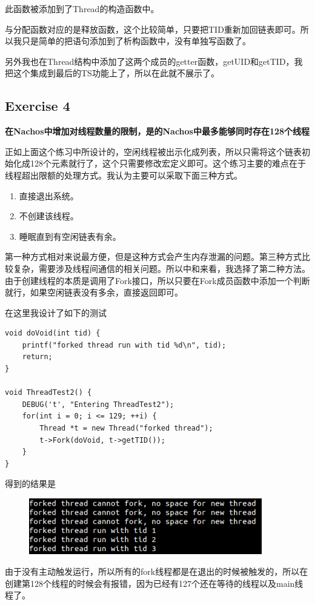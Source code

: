 \documentclass{ctexart}
\begin{document}
此函数被添加到了Thread的构造函数中。

与分配函数对应的是释放函数，这个比较简单，只要把TID重新加回链表即可。所以我只是简单的把语句添加到了析构函数中，没有单独写函数了。

另外我也在Thread结构中添加了这两个成员的getter函数，getUID和getTID，我把这个集成到最后的TS功能上了，所以在此就不展示了。

\subsection*{Exercise 4}
\textbf{在Nachos中增加对线程数量的限制，是的Nachos中最多能够同时存在128个线程}

正如上面这个练习中所设计的，空闲线程被出示化成列表，所以只需将这个链表初始化成128个元素就行了，这个只需要修改宏定义即可。这个练习主要的难点在于线程超出限额的处理方式。我认为主要可以采取下面三种方式。
\begin{enumerate}
\item 直接退出系统。
\item 不创建该线程。
\item 睡眠直到有空闲链表有余。
\end{enumerate}

第一种方式相对来说最方便，但是这种方式会产生内存泄漏的问题。第三种方式比较复杂，需要涉及线程间通信的相关问题。所以中和来看，我选择了第二种方法。由于创建线程的本质是调用了Fork接口，所以只要在Fork成员函数中添加一个判断就行，如果空闲链表没有多余，直接返回即可。

在这里我设计了如下的测试
\begin{lstlisting}
void doVoid(int tid) {
    printf("forked thread run with tid %d\n", tid);
    return;
}

void ThreadTest2() {
    DEBUG('t', "Entering ThreadTest2");
    for(int i = 0; i <= 129; ++i) {
        Thread *t = new Thread("forked thread");
        t->Fork(doVoid, t->getTID());
    }
}
\end{lstlisting}

得到的结果是
\begin{figure}[h]
 \centering
\includegraphics[width=4in]{ex2.png}
\end{figure}

由于没有主动触发运行，所以所有的fork线程都是在退出的时候被触发的，所以在创建第128个线程的时候会有报错，因为已经有127个还在等待的线程以及main线程了。
\end{document}
